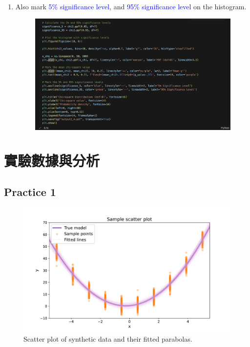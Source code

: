 \documentclass[12pt,a4paper]{article}
\begin{document}
\begin{CJK}{UTF8}{bkai}
\begin{enumerate}
    \item Also mark \textcolor{blue}{5\% significance level}, and \textcolor{blue}{95\% significance level} on the histogram.
    \begin{figure}[h]
        \centering
        \includegraphics[width=1\linewidth]{figures/code/practice_2/code_2_7.png}
        \label{fig:code_2_7}
    \end{figure}
\end{enumerate}


\clearpage
\section{實驗數據與分析}
\subsection{Practice 1}\label{subsec:result_1}
\hfill

\begin{figure}[h]
    \centering
    \includegraphics[width=1\linewidth]{figures/output/practice_1/output1_1.pdf}
    \caption{Scatter plot of synthetic data and their fitted parabolas.}
    \label{fig:output1_1}
\end{figure}


\end{CJK}
\end{document}
